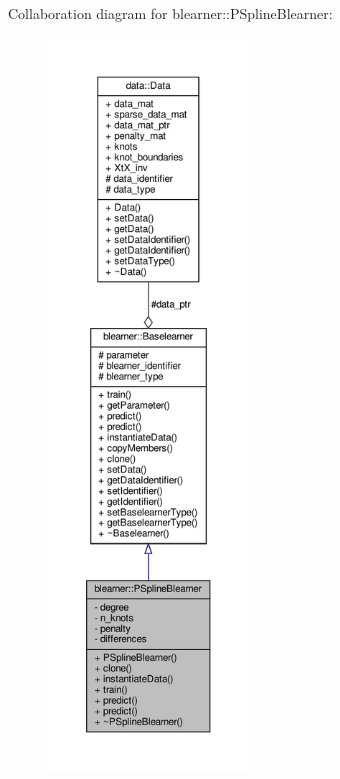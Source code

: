 Collaboration diagram for blearner\+:\+:P\+Spline\+Blearner\+:
\nopagebreak
\begin{figure}[H]
\begin{center}
\leavevmode
\includegraphics[height=550pt]{classblearner_1_1_p_spline_blearner__coll__graph}
\end{center}
\end{figure}
